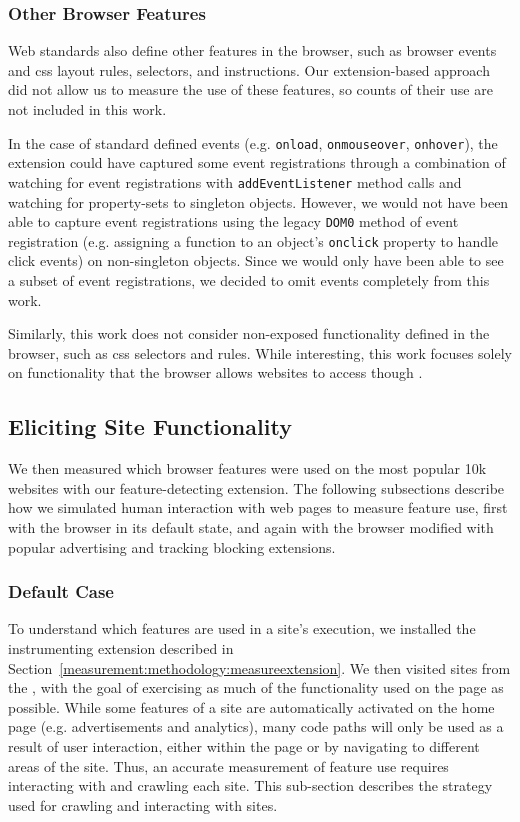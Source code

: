 \subsubsection{Other Browser Features}
Web standards also define other features in the browser, such as browser events
and \gls{css} layout rules, selectors, and instructions.  Our extension-based
approach did not allow us to measure the use of these features, so counts
of their use are not included in this work.

In the case of standard defined events (e.g. \texttt{onload},
\texttt{onmouseover}, \texttt{onhover}), the extension could have
captured some event registrations through a combination of watching for
event registrations with \texttt{addEventListener} method calls
and watching for property-sets to singleton objects.  However, we would not
have been able to capture event registrations using the legacy \texttt{DOM0}
method of event registration (e.g. assigning a function to an object's
\texttt{onclick} property to handle click events) on non-singleton objects.
Since we would only have been able to see a subset of event registrations,
we decided to omit events completely from this work.

Similarly, this work does not consider non-\JS exposed functionality defined in
the browser, such as \gls{css} selectors and rules.  While interesting, this
work focuses solely on functionality that the browser allows websites to access
though \JS.


\subsection{Eliciting Site Functionality}
\label{measurement:methodology:eliciting-site-functionality}
We then measured which browser features were used on the most popular 10k
websites with our feature-detecting extension.  The following subsections
describe how we simulated human interaction with web pages to measure feature
use, first with the browser in its default state, and again with the browser
modified with popular advertising and tracking blocking extensions.


\subsubsection{Default Case}
\label{measurement:methodology:default-case-measurements}
To understand which features are used in a site's execution, we installed the
instrumenting extension described in
Section~\ref{measurement:methodology:measureextension}. We then visited sites
from the \ATK, with the goal of exercising as much of the functionality
used on the page as possible.  While some \JS features of a site are
automatically activated on the home page (e.g. advertisements and analytics),
many code paths will only be used as a result of user interaction, either
within the page or by navigating to different areas of the site. Thus, an
accurate measurement of feature use requires interacting with and crawling each
site.  This sub-section describes the strategy used for crawling and
interacting with sites.

